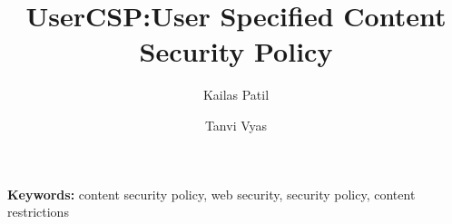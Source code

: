 \documentclass{llncs}
\begin{document}
\title{UserCSP:User Specified Content Security Policy}

\author{Kailas Patil \and Tanvi Vyas}


 

\maketitle



{\bf Keywords:} content security policy, web security, security policy, content restrictions 















\end{document}
